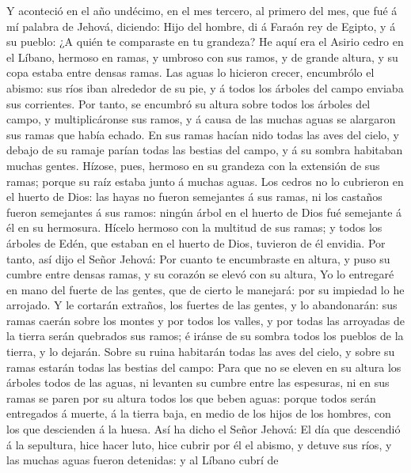  Y aconteció en el año undécimo, en el mes tercero, al
primero del mes, que fué á mí palabra de Jehová, diciendo:
 Hijo del hombre, di á Faraón rey de Egipto, y á su
pueblo: ¿A quién te comparaste en tu grandeza?  He aquí
era el Asirio cedro en el Líbano, hermoso en ramas, y umbroso con sus
ramos, y de grande altura, y su copa estaba entre densas ramas.
 Las aguas lo hicieron crecer, encumbrólo el abismo: sus
ríos iban alrededor de su pie, y á todos los árboles del campo enviaba
sus corrientes.  Por tanto, se encumbró su altura sobre
todos los árboles del campo, y multiplicáronse sus ramos, y á causa de
las muchas aguas se alargaron sus ramas que había echado. 
En sus ramas hacían nido todas las aves del cielo, y debajo de su ramaje
parían todas las bestias del campo, y á su sombra habitaban muchas
gentes.  Hízose, pues, hermoso en su grandeza con la
extensión de sus ramas; porque su raíz estaba junto á muchas aguas.
 Los cedros no lo cubrieron en el huerto de Dios: las
hayas no fueron semejantes á sus ramas, ni los castaños fueron
semejantes á sus ramos: ningún árbol en el huerto de Dios fué semejante
á él en su hermosura.  Hícelo hermoso con la multitud de
sus ramas; y todos los árboles de Edén, que estaban en el huerto de
Dios, tuvieron de él envidia.  Por tanto, así dijo el
Señor Jehová: Por cuanto te encumbraste en altura, y puso su cumbre
entre densas ramas, y su corazón se elevó con su altura, 
Yo lo entregaré en mano del fuerte de las gentes, que de cierto le
manejará: por su impiedad lo he arrojado.  Y le cortarán
extraños, los fuertes de las gentes, y lo abandonarán: sus ramas caerán
sobre los montes y por todos los valles, y por todas las arroyadas de la
tierra serán quebrados sus ramos; é iránse de su sombra todos los
pueblos de la tierra, y lo dejarán.  Sobre su ruina
habitarán todas las aves del cielo, y sobre su ramas estarán todas las
bestias del campo:  Para que no se eleven en su altura
los árboles todos de las aguas, ni levanten su cumbre entre las
espesuras, ni en sus ramas se paren por su altura todos los que beben
aguas: porque todos serán entregados á muerte, á la tierra baja, en
medio de los hijos de los hombres, con los que descienden á la huesa.
 Así ha dicho el Señor Jehová: El día que descendió á la
sepultura, hice hacer luto, hice cubrir por él el abismo, y detuve sus
ríos, y las muchas aguas fueron detenidas: y al Líbano cubrí de
